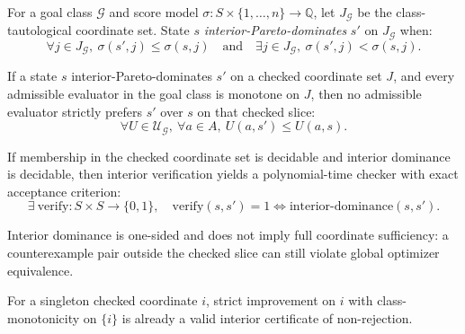 \begin{definition}\label{def:interior-pareto-dominance}
For a goal class $\mathcal{G}$ and score model $\sigma:S\times\{1,\ldots,n\}\to\mathbb{Q}$, let $J_{\mathcal{G}}$ be the class-tautological coordinate set.
State $s$ \emph{interior-Pareto-dominates} $s'$ on $J_{\mathcal{G}}$ when:
\[
\forall j\in J_{\mathcal{G}},\ \sigma(s',j)\le \sigma(s,j)
\quad\text{and}\quad
\exists j\in J_{\mathcal{G}},\ \sigma(s',j)<\sigma(s,j).
\]
\end{definition}

\begin{proposition}\label{prop:interior-universal-non-rejection}
If a state $s$ interior-Pareto-dominates $s'$ on a checked coordinate set $J$, and every admissible evaluator in the goal class is monotone on $J$, then no admissible evaluator strictly prefers $s'$ over $s$ on that checked slice:
\[
\forall U\in\mathcal{U}_{\mathcal{G}},\ \forall a\in A,\ U(a,s')\le U(a,s).
\]
\end{proposition}

\begin{proposition}\label{prop:interior-verification-tractable}
If membership in the checked coordinate set is decidable and interior dominance is decidable, then interior verification yields a polynomial-time checker with exact acceptance criterion:
\[
\exists\ \mathrm{verify}:S\times S\to\{0,1\},\quad
\mathrm{verify}(s,s')=1\iff \text{interior-dominance}(s,s').
\]
\end{proposition}

\begin{proposition}\label{prop:interior-one-sidedness}
Interior dominance is one-sided and does not imply full coordinate sufficiency:
a counterexample pair outside the checked slice can still violate global optimizer equivalence.
\end{proposition}

\begin{corollary}\label{cor:interior-singleton-certificate}
For a singleton checked coordinate $i$, strict improvement on $i$ with class-monotonicity on $\{i\}$ is already a valid interior certificate of non-rejection.
\end{corollary}

